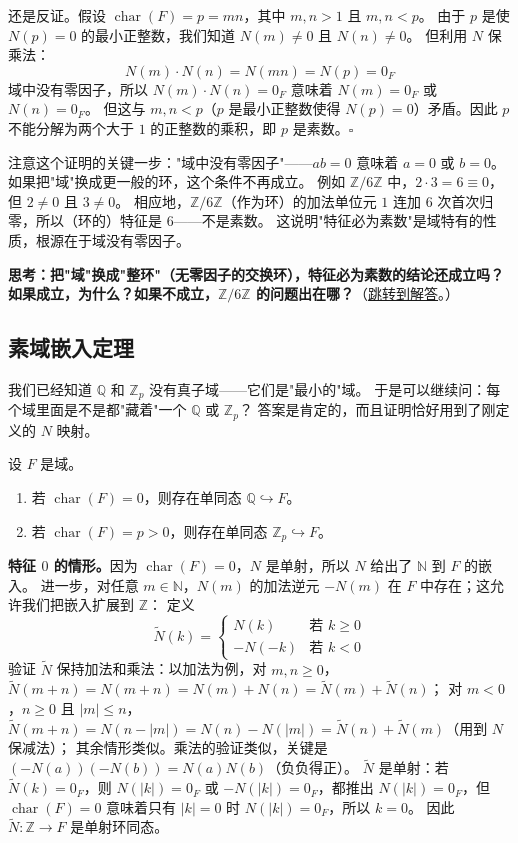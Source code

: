 还是反证。假设 $\operatorname{char}(F) = p = mn$，其中 $m, n > 1$ 且 $m, n < p$。
由于 $p$ 是使 $N(p) = 0$ 的最小正整数，我们知道 $N(m) \neq 0$ 且 $N(n) \neq 0$。
但利用 $N$ 保乘法：
\[
N(m) \cdot N(n) = N(mn) = N(p) = 0_F
\]
域中没有零因子，所以 $N(m) \cdot N(n) = 0_F$ 意味着 $N(m) = 0_F$ 或 $N(n) = 0_F$。
但这与 $m, n < p$（$p$ 是最小正整数使得 $N(p)=0$）矛盾。因此 $p$ 不能分解为两个大于 $1$ 的正整数的乘积，即 $p$ 是素数。$\square$

注意这个证明的关键一步："域中没有零因子"——$ab = 0$ 意味着 $a = 0$ 或 $b = 0$。
如果把"域"换成更一般的环，这个条件不再成立。
例如 $\mathbb{Z}/6\mathbb{Z}$ 中，$2 \cdot 3 = 6 \equiv 0$，但 $2 \neq 0$ 且 $3 \neq 0$。
相应地，$\mathbb{Z}/6\mathbb{Z}$（作为环）的加法单位元 $1$ 连加 $6$ 次首次归零，所以（环的）特征是 $6$——不是素数。
这说明"特征必为素数"是域特有的性质，根源在于域没有零因子。

\hypertarget{q:char-prime-domain}{}
\medskip
\noindent\textbf{思考：把"域"换成"整环"（无零因子的交换环），特征必为素数的结论还成立吗？如果成立，为什么？如果不成立，$\mathbb{Z}/6\mathbb{Z}$ 的问题出在哪？}（\hyperlink{ans:char-prime-domain}{跳转到解答}。）
\medskip

\subsection{素域嵌入定理}

我们已经知道 $\mathbb{Q}$ 和 $\mathbb{Z}_p$ 没有真子域——它们是"最小的"域。
于是可以继续问：每个域里面是不是都"藏着"一个 $\mathbb{Q}$ 或 $\mathbb{Z}_p$？
答案是肯定的，而且证明恰好用到了刚定义的 $N$ 映射。

\begin{theorem}[素域嵌入定理]\label{thm:prime-field-embedding}
设 $F$ 是域。
\begin{enumerate}
    \item 若 $\operatorname{char}(F) = 0$，则存在单同态 $\mathbb{Q} \hookrightarrow F$。
    \item 若 $\operatorname{char}(F) = p > 0$，则存在单同态 $\mathbb{Z}_p \hookrightarrow F$。
\end{enumerate}
\end{theorem}

\textbf{特征 $0$ 的情形。}因为 $\operatorname{char}(F) = 0$，$N$ 是单射，所以 $N$ 给出了 $\mathbb{N}$ 到 $F$ 的嵌入。
进一步，对任意 $m \in \mathbb{N}$，$N(m)$ 的加法逆元 $-N(m)$ 在 $F$ 中存在；这允许我们把嵌入扩展到 $\mathbb{Z}$：
定义
\[\tilde{N}(k) = \begin{cases} N(k) & \text{若 } k \geq 0 \\ -N(-k) & \text{若 } k < 0 \end{cases}\]
验证 $\tilde{N}$ 保持加法和乘法：以加法为例，对 $m, n \geq 0$，$\tilde{N}(m + n) = N(m + n) = N(m) + N(n) = \tilde{N}(m) + \tilde{N}(n)$；
对 $m < 0$，$n \geq 0$ 且 $|m| \leq n$，$\tilde{N}(m + n) = N(n - |m|) = N(n) - N(|m|) = \tilde{N}(n) + \tilde{N}(m)$（用到 $N$ 保减法）；
其余情形类似。乘法的验证类似，关键是 $(-N(a))(-N(b)) = N(a)N(b)$（负负得正）。
$\tilde{N}$ 是单射：若 $\tilde{N}(k) = 0_F$，则 $N(|k|) = 0_F$ 或 $-N(|k|) = 0_F$，都推出 $N(|k|) = 0_F$，但 $\operatorname{char}(F) = 0$ 意味着只有 $|k| = 0$ 时 $N(|k|) = 0_F$，所以 $k = 0$。
因此 $\tilde{N}: \mathbb{Z} \to F$ 是单射环同态。

